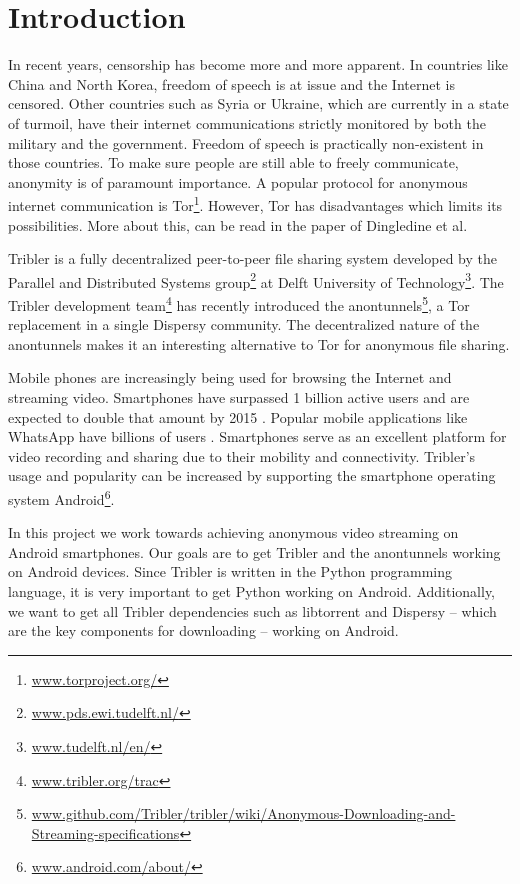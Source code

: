 \chapter{Introduction}
In recent years, censorship has become more and more apparent. In countries like China and North Korea, freedom of speech is at issue and the Internet is censored. Other countries such as Syria or Ukraine, which are currently in a state of turmoil, have their internet communications strictly monitored by both the military and the government. Freedom of speech is practically non-existent in those countries. To make sure people are still able to freely communicate, anonymity is of paramount importance. A popular protocol for anonymous internet communication is Tor\footnote{\href{https://www.torproject.org/}{www.torproject.org/}}. However, Tor has disadvantages which limits its possibilities. More about this, can be read in the paper of Dingledine et al. \cite{dingledine2009performance}

Tribler is a fully decentralized peer-to-peer file sharing system developed by the Parallel and Distributed Systems group\footnote{\href{http://www.pds.ewi.tudelft.nl/}{www.pds.ewi.tudelft.nl/}} at Delft University of Technology\footnote{\href{http://www.tudelft.nl/en/}{www.tudelft.nl/en/}}. The Tribler development team\footnote{\href{http://www.tribler.org/trac}{www.tribler.org/trac}} has recently introduced the anontunnels\footnote{\href{https://github.com/Tribler/tribler/wiki/Anonymous-Downloading-and-Streaming-specifications}{www.github.com/Tribler/tribler/wiki/Anonymous-Downloading-and-Streaming-specifications}}, a Tor replacement in a single Dispersy\cite{zeilemaker2013dispersy} community. The decentralized nature of the anontunnels makes it an interesting alternative to Tor for anonymous file sharing.

Mobile phones are increasingly being used for browsing the Internet and streaming video. Smartphones have surpassed 1 billion active users and are expected to double that amount by 2015 \cite{yang2015smartphones}. Popular mobile applications like WhatsApp have billions of users \cite{googleplayinstagram, googleplaywhatsapp}. Smartphones serve as an excellent platform for video recording and sharing due to their mobility and connectivity. Tribler's usage and popularity can be increased by supporting the smartphone operating system Android\footnote{\href{http://www.android.com/about/}{www.android.com/about/}}.

In this project we work towards achieving anonymous video streaming on Android smartphones. Our goals are to get Tribler and the anontunnels working on Android devices. Since Tribler is written in the Python programming language, it is very important to get Python working on Android. Additionally, we want to get all Tribler dependencies such as libtorrent and Dispersy -- which are the key components for downloading -- working on Android.

